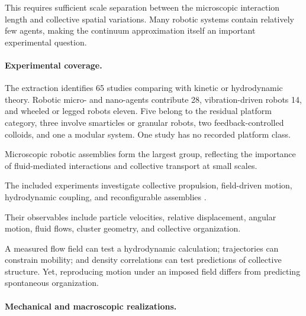 This requires sufficient scale separation
between the microscopic interaction length
and collective spatial variations.
Many robotic systems contain relatively few
agents, making the continuum approximation
itself an important experimental question.

\paragraph*{Experimental coverage.}

The extraction identifies 65 studies comparing
with kinetic or hydrodynamic theory.
Robotic micro- and nano-agents contribute 28,
vibration-driven robots 14,
and wheeled or legged robots eleven.
Five belong to the residual platform category,
three involve smarticles or granular robots,
two feedback-controlled colloids,
and one a modular system.
One study has no recorded platform class.

Microscopic robotic assemblies form the largest
group, reflecting the importance of fluid-mediated
interactions and collective transport at small scales.

The included experiments investigate collective
propulsion, field-driven motion, hydrodynamic
coupling, and reconfigurable assemblies
\cite{Sun2021swarmingmicrodrople,Calabr2026interactiondrivena,Xie2020bioinspiredsoftmic,Pauer2021programmabledesign,Yigit2019programmablecollect,Das2023optoelectronictraje,McGovern2024multifunctionalchir,Sun2024multiplemagnetoopt,Liu2022bionicmorphological,Xu2023multiplecilialike,Yue2022wheellikemagnetic,Wang2018collectivebehavior,Chen2022programmablespatio,Xu2022collectivebehaviors,Baker2019shapeprogrammed3d,Goyal2025externallycontrolle,Aubret2018targetedassemblyan,Ahmed2021bioinspiredacousto,Yan2024programmingstructur,Yigit2020cohesiveselforgani,Hanson2025electrokineticpropu,Xu2023bioinspiredciliali,Ji2021ondemandassemblya,Xie2019programmablegenerat,Law2024navigationofmagnet,Yu2022adaptivepatternand,Ceron2026fluidictorqueenabl,Li2022vectorcontrolledwh}.

Their observables include particle velocities,
relative displacement, angular motion,
fluid flows, cluster geometry, and
collective organization.

A measured flow field can test a hydrodynamic
calculation; trajectories can constrain mobility;
and density correlations can test predictions
of collective structure. Yet, reproducing
motion under an imposed field differs from
predicting spontaneous organization.

\paragraph*{Mechanical and macroscopic realizations.}

